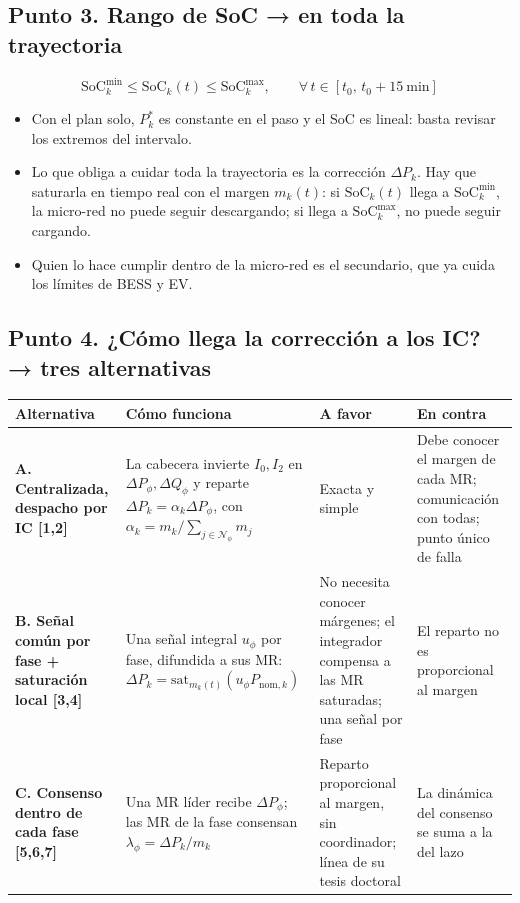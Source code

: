 \documentclass[10pt,a4paper]{article}
\newcommand{\SoC}{\mathrm{SoC}}
\begin{document}
\subsection*{Punto 3. Rango de SoC → en toda la trayectoria}
\[
\SoC^{\min}_k\le \SoC_k(t)\le \SoC^{\max}_k,\qquad \forall\,t\in[t_0,\,t_0+15\ \mathrm{min}]
\]
\begin{itemize}
  \item Con el plan solo, $P^*_k$ es constante en el paso y el SoC es lineal: basta revisar los extremos del intervalo.
  \item Lo que obliga a cuidar toda la trayectoria es la corrección $\Delta P_k$. Hay que saturarla en tiempo real con el margen
  $m_k(t)$: si $\SoC_k(t)$ llega a $\SoC^{\min}_k$, la micro-red no puede seguir descargando; si llega a $\SoC^{\max}_k$, no puede seguir cargando.
  \item Quien lo hace cumplir dentro de la micro-red es el secundario, que ya cuida los límites de BESS y EV.
\end{itemize}

\subsection*{Punto 4. ¿Cómo llega la corrección a los IC? → tres alternativas}
\renewcommand{\arraystretch}{1.3}
\begin{tabularx}{\textwidth}{>{\bfseries}p{2.3cm}XXX}
\toprule
Alternativa & Cómo funciona & A favor & En contra\\
\midrule
A. Centralizada, despacho por IC [1,2] & La cabecera invierte $I_0,I_2$ en $\Delta P_\phi,\Delta Q_\phi$ y reparte $\Delta P_k=\alpha_k\Delta P_\phi$, con $\alpha_k=m_k/\sum_{j\in\mathcal N_\phi}m_j$ & Exacta y simple & Debe conocer el margen de cada MR; comunicación con todas; punto único de falla\\
B. Señal común por fase + saturación local [3,4] & Una señal integral $u_\phi$ por fase, difundida a sus MR: $\Delta P_k=\mathrm{sat}_{m_k(t)}(u_\phi P_{\mathrm{nom},k})$ & No necesita conocer márgenes; el integrador compensa a las MR saturadas; una señal por fase & El reparto no es proporcional al margen\\
C. Consenso dentro de cada fase [5,6,7] & Una MR líder recibe $\Delta P_\phi$; las MR de la fase consensan $\lambda_\phi=\Delta P_k/m_k$ & Reparto proporcional al margen, sin coordinador; línea de su tesis doctoral & La dinámica del consenso se suma a la del lazo\\
\bottomrule
\end{tabularx}
\end{document}
